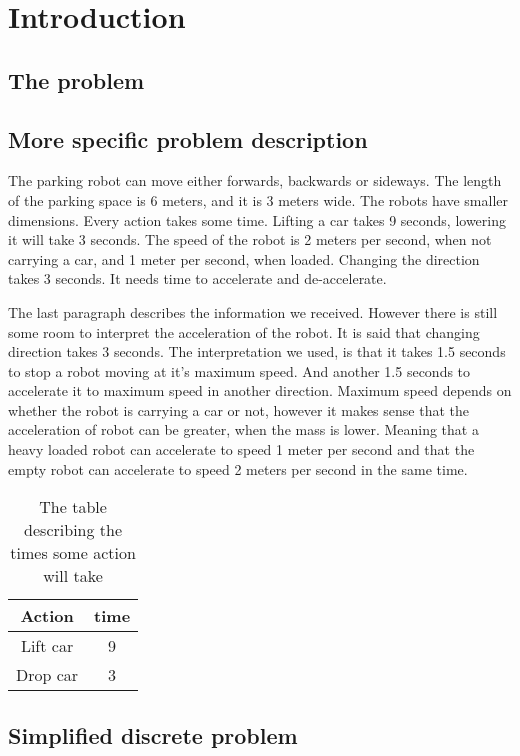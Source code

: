 \section{Introduction}
\subsection{The problem}
\subsection{More specific problem description}
The parking robot can move either forwards, backwards or sideways. The length of
the parking space is 6 meters, and it is 3 meters wide. The robots have smaller
dimensions. Every action takes some time. Lifting a car takes 9 seconds,
lowering it will take 3 seconds. The speed of the robot is 2 meters per second,
when not carrying a car, and 1 meter per second, when loaded. Changing the
direction takes 3 seconds. It needs time to accelerate and de-accelerate. 

The last paragraph describes the information we received. However there is still
some room to interpret the acceleration of the robot. It is said that changing
direction takes 3 seconds. The interpretation we used, is that it takes 1.5
seconds to stop a robot moving at it's maximum speed. And another 1.5 seconds to
accelerate it to maximum speed in another direction. Maximum speed depends on
whether the robot is carrying a car or not, however it makes sense that the
acceleration of robot can be greater, when the mass is lower. Meaning that a
heavy loaded robot can accelerate to speed 1 meter per second and that the empty
robot can accelerate to speed 2 meters per second in the same time.

\begin{table}
    \begin{tabular}{| c | c |}
        \hline
        Action & time\\
        \hline
        Lift car & 9\\
        Drop car & 3\\
        \hline
    \end{tabular}
    \caption{The table describing the times some action will take}
\end{table}
\subsection{Simplified discrete problem}
